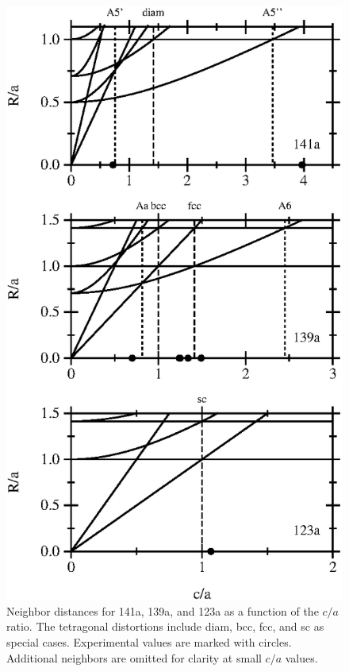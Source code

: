 \documentclass[preprint]{revtex4}              %
\begin{document}
\begin{figure}
\begin{center}
\includegraphics{tetrEPS.eps}
\end{center}
\caption[Neighbor distances for 141a, 139a, and 123a]{Neighbor
distances for 141a, 139a, and 123a as a function of the $c/a$ ratio.
The tetragonal distortions include diam, bcc, fcc, and sc as special
cases.  Experimental values are marked with circles.  Additional
neighbors are omitted for clarity at small $c/a$ values.}
\label{fig:tetr}
\end{figure}
\end{document}
